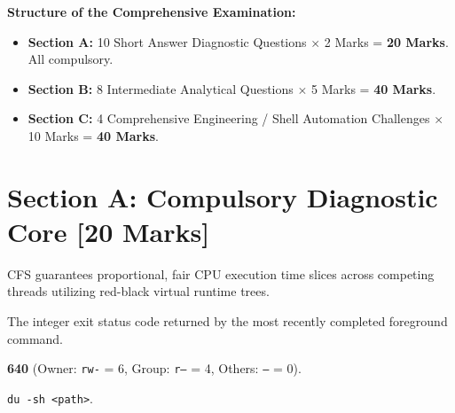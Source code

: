 
\begin{markingrubric}
\textbf{Structure of the Comprehensive Examination:}
\begin{itemize}[leftmargin=1.5em, itemsep=1pt]
    \item \textbf{Section A:} 10 Short Answer Diagnostic Questions $\times$ 2 Marks = \textbf{20 Marks}. All compulsory.
    \item \textbf{Section B:} 8 Intermediate Analytical Questions $\times$ 5 Marks = \textbf{40 Marks}.
    \item \textbf{Section C:} 4 Comprehensive Engineering / Shell Automation Challenges $\times$ 10 Marks = \textbf{40 Marks}.
\end{itemize}
\end{markingrubric}

\section*{Section A: Compulsory Diagnostic Core [20 Marks]}

\begin{examsol}
CFS guarantees proportional, fair CPU execution time slices across competing threads utilizing red-black virtual runtime trees.
\end{examsol}

\begin{examsol}
The integer exit status code returned by the most recently completed foreground command.
\end{examsol}

\begin{examsol}
\textbf{640} (Owner: \texttt{rw-} = 6, Group: \texttt{r--} = 4, Others: \texttt{---} = 0).
\end{examsol}

\begin{examsol}
\texttt{du -sh <path>}.
\end{examsol}


